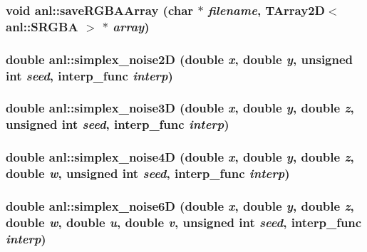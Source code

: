 \label{namespaceanl_afc417846b4790dc37e817455621a68b4}
\hypertarget{namespaceanl_aeb0dcff0d6e0bb67b7ec1846d10b3b53}{
\subsubsection[{saveRGBAArray}]{\setlength{\rightskip}{0pt plus 5cm}void anl::saveRGBAArray (char $\ast$ {\em filename}, \/  {\bf TArray2D}$<$ {\bf anl::SRGBA} $>$ $\ast$ {\em array})}}
\label{namespaceanl_aeb0dcff0d6e0bb67b7ec1846d10b3b53}
\hypertarget{namespaceanl_a14a7ed5f51db5b1b83aa301e2bdf0a4a}{
\subsubsection[{simplex\_\-noise2D}]{\setlength{\rightskip}{0pt plus 5cm}double anl::simplex\_\-noise2D (double {\em x}, \/  double {\em y}, \/  unsigned int {\em seed}, \/  interp\_\-func {\em interp})}}
\label{namespaceanl_a14a7ed5f51db5b1b83aa301e2bdf0a4a}
\hypertarget{namespaceanl_a60bd7840a2e23a6a799aa532115b9a01}{
\subsubsection[{simplex\_\-noise3D}]{\setlength{\rightskip}{0pt plus 5cm}double anl::simplex\_\-noise3D (double {\em x}, \/  double {\em y}, \/  double {\em z}, \/  unsigned int {\em seed}, \/  interp\_\-func {\em interp})}}
\label{namespaceanl_a60bd7840a2e23a6a799aa532115b9a01}
\hypertarget{namespaceanl_ab7eda71be575c2dd3ffd3ca3b220cf69}{
\subsubsection[{simplex\_\-noise4D}]{\setlength{\rightskip}{0pt plus 5cm}double anl::simplex\_\-noise4D (double {\em x}, \/  double {\em y}, \/  double {\em z}, \/  double {\em w}, \/  unsigned int {\em seed}, \/  interp\_\-func {\em interp})}}
\label{namespaceanl_ab7eda71be575c2dd3ffd3ca3b220cf69}
\hypertarget{namespaceanl_a864d63fa207aa567d03fe09cc13b7d10}{
\subsubsection[{simplex\_\-noise6D}]{\setlength{\rightskip}{0pt plus 5cm}double anl::simplex\_\-noise6D (double {\em x}, \/  double {\em y}, \/  double {\em z}, \/  double {\em w}, \/  double {\em u}, \/  double {\em v}, \/  unsigned int {\em seed}, \/  interp\_\-func {\em interp})}}
